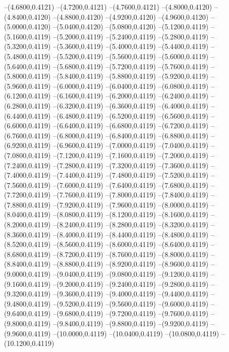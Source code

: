 {	--(4.6800,0.4121)
	--(4.7200,0.4121)
	--(4.7600,0.4121)
	--(4.8000,0.4120)
	--(4.8400,0.4120)
	--(4.8800,0.4120)
	--(4.9200,0.4120)
	--(4.9600,0.4120)
	--(5.0000,0.4120)
	--(5.0400,0.4120)
	--(5.0800,0.4120)
	--(5.1200,0.4119)
	--(5.1600,0.4119)
	--(5.2000,0.4119)
	--(5.2400,0.4119)
	--(5.2800,0.4119)
	--(5.3200,0.4119)
	--(5.3600,0.4119)
	--(5.4000,0.4119)
	--(5.4400,0.4119)
	--(5.4800,0.4119)
	--(5.5200,0.4119)
	--(5.5600,0.4119)
	--(5.6000,0.4119)
	--(5.6400,0.4119)
	--(5.6800,0.4119)
	--(5.7200,0.4119)
	--(5.7600,0.4119)
	--(5.8000,0.4119)
	--(5.8400,0.4119)
	--(5.8800,0.4119)
	--(5.9200,0.4119)
	--(5.9600,0.4119)
	--(6.0000,0.4119)
	--(6.0400,0.4119)
	--(6.0800,0.4119)
	--(6.1200,0.4119)
	--(6.1600,0.4119)
	--(6.2000,0.4119)
	--(6.2400,0.4119)
	--(6.2800,0.4119)
	--(6.3200,0.4119)
	--(6.3600,0.4119)
	--(6.4000,0.4119)
	--(6.4400,0.4119)
	--(6.4800,0.4119)
	--(6.5200,0.4119)
	--(6.5600,0.4119)
	--(6.6000,0.4119)
	--(6.6400,0.4119)
	--(6.6800,0.4119)
	--(6.7200,0.4119)
	--(6.7600,0.4119)
	--(6.8000,0.4119)
	--(6.8400,0.4119)
	--(6.8800,0.4119)
	--(6.9200,0.4119)
	--(6.9600,0.4119)
	--(7.0000,0.4119)
	--(7.0400,0.4119)
	--(7.0800,0.4119)
	--(7.1200,0.4119)
	--(7.1600,0.4119)
	--(7.2000,0.4119)
	--(7.2400,0.4119)
	--(7.2800,0.4119)
	--(7.3200,0.4119)
	--(7.3600,0.4119)
	--(7.4000,0.4119)
	--(7.4400,0.4119)
	--(7.4800,0.4119)
	--(7.5200,0.4119)
	--(7.5600,0.4119)
	--(7.6000,0.4119)
	--(7.6400,0.4119)
	--(7.6800,0.4119)
	--(7.7200,0.4119)
	--(7.7600,0.4119)
	--(7.8000,0.4119)
	--(7.8400,0.4119)
	--(7.8800,0.4119)
	--(7.9200,0.4119)
	--(7.9600,0.4119)
	--(8.0000,0.4119)
	--(8.0400,0.4119)
	--(8.0800,0.4119)
	--(8.1200,0.4119)
	--(8.1600,0.4119)
	--(8.2000,0.4119)
	--(8.2400,0.4119)
	--(8.2800,0.4119)
	--(8.3200,0.4119)
	--(8.3600,0.4119)
	--(8.4000,0.4119)
	--(8.4400,0.4119)
	--(8.4800,0.4119)
	--(8.5200,0.4119)
	--(8.5600,0.4119)
	--(8.6000,0.4119)
	--(8.6400,0.4119)
	--(8.6800,0.4119)
	--(8.7200,0.4119)
	--(8.7600,0.4119)
	--(8.8000,0.4119)
	--(8.8400,0.4119)
	--(8.8800,0.4119)
	--(8.9200,0.4119)
	--(8.9600,0.4119)
	--(9.0000,0.4119)
	--(9.0400,0.4119)
	--(9.0800,0.4119)
	--(9.1200,0.4119)
	--(9.1600,0.4119)
	--(9.2000,0.4119)
	--(9.2400,0.4119)
	--(9.2800,0.4119)
	--(9.3200,0.4119)
	--(9.3600,0.4119)
	--(9.4000,0.4119)
	--(9.4400,0.4119)
	--(9.4800,0.4119)
	--(9.5200,0.4119)
	--(9.5600,0.4119)
	--(9.6000,0.4119)
	--(9.6400,0.4119)
	--(9.6800,0.4119)
	--(9.7200,0.4119)
	--(9.7600,0.4119)
	--(9.8000,0.4119)
	--(9.8400,0.4119)
	--(9.8800,0.4119)
	--(9.9200,0.4119)
	--(9.9600,0.4119)
	--(10.0000,0.4119)
	--(10.0400,0.4119)
	--(10.0800,0.4119)
	--(10.1200,0.4119)
}
